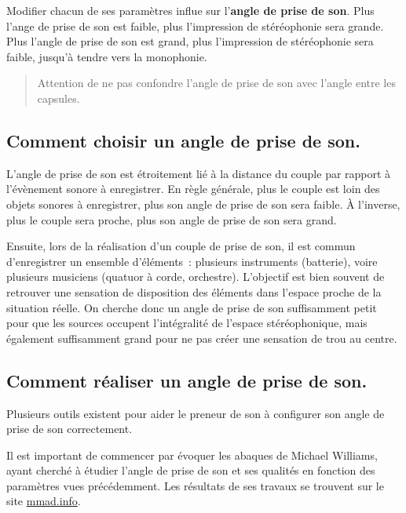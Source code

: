 \documentclass[
]{book}
\begin{document}
Modifier chacun de ses paramètres influe sur l'\textbf{angle de prise de son}. Plus l'ange de prise de son est faible, plus l'impression de stéréophonie sera grande. Plus l'angle de prise de son est grand, plus l'impression de stéréophonie sera faible, jusqu'à tendre vers la monophonie.

\begin{quote}
Attention de ne pas confondre l'angle de prise de son avec l'angle entre les capsules.
\end{quote}

\hypertarget{comment-choisir-un-angle-de-prise-de-son.}{%
\subsection{Comment choisir un angle de prise de son.}\label{comment-choisir-un-angle-de-prise-de-son.}}

L'angle de prise de son est étroitement lié à la distance du couple par rapport à l'évènement sonore à enregistrer. En règle générale, plus le couple est loin des objets sonores à enregistrer, plus son angle de prise de son sera faible. À l'inverse, plus le couple sera proche, plus son angle de prise de son sera grand.

Ensuite, lors de la réalisation d'un couple de prise de son, il est commun d'enregistrer un ensemble d'éléments~: plusieurs instruments (batterie), voire plusieurs musiciens (quatuor à corde, orchestre). L'objectif est bien souvent de retrouver une sensation de disposition des éléments dans l'espace proche de la situation réelle. On cherche donc un angle de prise de son suffisamment petit pour que les sources occupent l'intégralité de l'espace stéréophonique, mais également suffisamment grand pour ne pas créer une sensation de trou au centre.

\hypertarget{comment-ruxe9aliser-un-angle-de-prise-de-son.}{%
\subsection{Comment réaliser un angle de prise de son.}\label{comment-ruxe9aliser-un-angle-de-prise-de-son.}}

Plusieurs outils existent pour aider le preneur de son à configurer son angle de prise de son correctement.

Il est important de commencer par évoquer les abaques de Michael Williams, ayant cherché à étudier l'angle de prise de son et ses qualités en fonction des paramètres vues précédemment. Les résultats de ses travaux se trouvent sur le site \href{https://www.mmad.info/MAD/2\%20Ch/2ch.htm}{mmad.info}.
\end{document}
